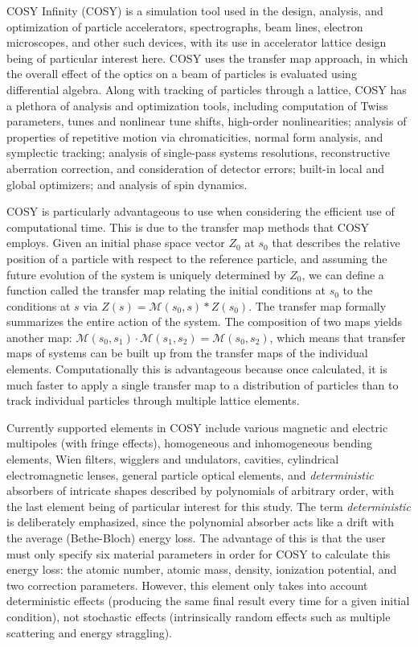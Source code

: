 \documentclass{jacow}
\begin{document}
COSY Infinity (COSY) \cite{COSY} is a simulation tool used in the design, analysis, and optimization of particle accelerators, spectrographs, beam lines, electron microscopes, and other such devices, with its use in accelerator lattice design being of particular interest here. COSY uses the transfer map approach, in which the overall effect of the optics on a beam of particles is evaluated using differential algebra. Along with tracking of particles through a lattice, COSY has a plethora of analysis and optimization tools, including computation of Twiss parameters, tunes and nonlinear tune shifts, high-order nonlinearities; analysis of properties of repetitive motion via chromaticities, normal form analysis, and symplectic tracking; analysis of single-pass systems resolutions, reconstructive aberration correction, and consideration of detector errors; built-in local and global optimizers; and analysis of spin dynamics.

COSY is particularly advantageous to use when considering the efficient use of computational time. This is due to the transfer map methods that COSY employs. Given an initial phase space vector $Z_0$ at $s_0$ that describes the relative position of a particle with respect to the reference particle, and assuming the future evolution of the system is uniquely determined by $Z_0$, we can define a function called the transfer map relating the initial conditions at $s_0$ to the conditions at $s$ via $Z(s)=\mathcal{M}(s_0,s)*Z(s_0)$. The transfer map formally summarizes the entire action of the system. The composition of two maps yields another map: $\mathcal{M}(s_0,s_1 )\cdot\mathcal{M}(s_1,s_2 )=\mathcal{M}(s_0,s_2)$, which means that transfer maps of systems can be built up from the transfer maps of the individual elements. Computationally this is advantageous because once calculated, it is much faster to apply a single transfer map to a distribution of particles than to track individual particles through multiple lattice elements.

Currently supported elements in COSY include various magnetic and electric multipoles (with fringe effects), homogeneous and inhomogeneous bending elements, Wien filters, wigglers and undulators, cavities, cylindrical electromagnetic lenses, general particle optical elements, and \emph{deterministic} absorbers of intricate shapes described by polynomials of arbitrary order, with the last element being of particular interest for this study. The term \emph{deterministic} is deliberately emphasized, since the polynomial absorber acts like a drift with the average (Bethe-Bloch) energy loss. The advantage of this is that the user must only specify six material parameters in order for COSY to calculate this energy loss: the atomic number, atomic mass, density, ionization potential, and two correction parameters. However, this element only takes into account deterministic effects (producing the same final result every time for a given initial condition), not stochastic effects (intrinsically random effects such as multiple scattering and energy straggling).
\end{document}
